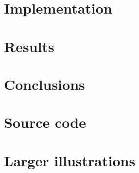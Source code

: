 \documentclass[12pt,a4paper]{report}
\begin{document}
\chapter{Implementation}
    
    \newpage
\chapter{Results}
    
    \newpage
\chapter{Conclusions}
    


\newpage
\renewcommand{\bibname}{\hspace{42pt}References} 
\printbibliography

\appendix
\begin{appendices}
\chapter{Source code}
    
\chapter{Larger illustrations}
\end{appendices}
\end{document}
